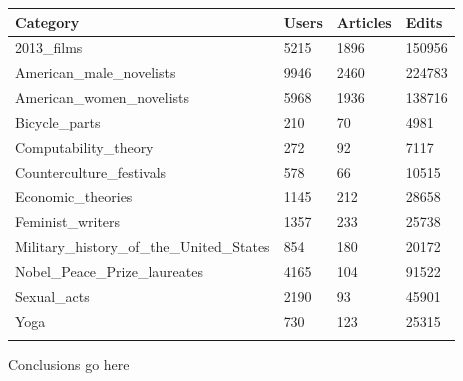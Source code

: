 \documentclass{acm_proc_article-sp}
\begin{document}
\begin{tabular}{llll}
\toprule
Category & Users & Articles &  Edits \\
\midrule
2013\_films &  5215 &     1896 &  150956 \\
American\_male\_novelists &  9946 &     2460 &  224783 \\
American\_women\_novelists &  5968 &     1936 &  138716 \\
Bicycle\_parts &   210 &       70 &    4981 \\
Computability\_theory &   272 &       92 &    7117 \\
Counterculture\_festivals &   578 &       66 &   10515 \\
Economic\_theories &  1145 &      212 &   28658 \\
Feminist\_writers &  1357 &      233 &   25738 \\
Military\_history\_of\_the\_United\_States &   854 &      180 &   20172 \\
Nobel\_Peace\_Prize\_laureates &  4165 &      104 &   91522 \\
Sexual\_acts &  2190 &       93 &   45901 \\
Yoga &   730 &      123 &   25315 \\
\bottomrule
\label{tab:statistics}
\end{tabular}


Conclusions go here



  

%
%
\end{document}
